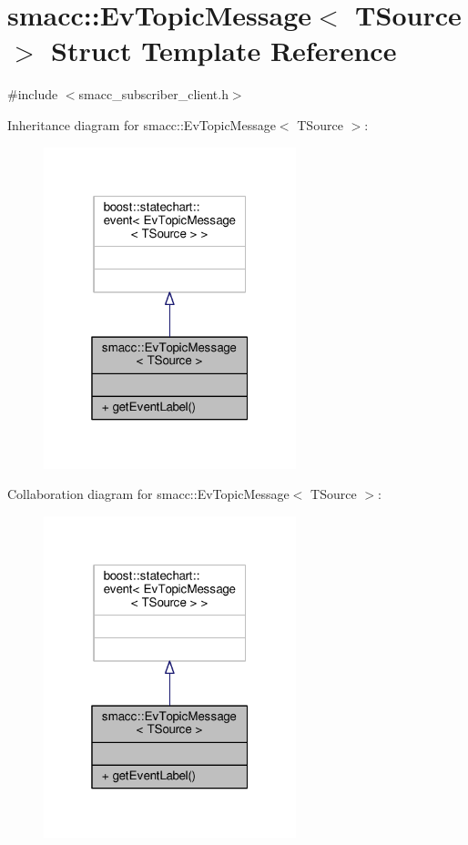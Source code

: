 \hypertarget{structsmacc_1_1EvTopicMessage}{}\section{smacc\+:\+:Ev\+Topic\+Message$<$ T\+Source $>$ Struct Template Reference}
\label{structsmacc_1_1EvTopicMessage}


{\ttfamily \#include $<$smacc\+\_\+subscriber\+\_\+client.\+h$>$}



Inheritance diagram for smacc\+:\+:Ev\+Topic\+Message$<$ T\+Source $>$\+:
\nopagebreak
\begin{figure}[H]
\begin{center}
\leavevmode
\includegraphics[width=208pt]{structsmacc_1_1EvTopicMessage__inherit__graph}
\end{center}
\end{figure}


Collaboration diagram for smacc\+:\+:Ev\+Topic\+Message$<$ T\+Source $>$\+:
\nopagebreak
\begin{figure}[H]
\begin{center}
\leavevmode
\includegraphics[width=208pt]{structsmacc_1_1EvTopicMessage__coll__graph}
\end{center}
\end{figure}
